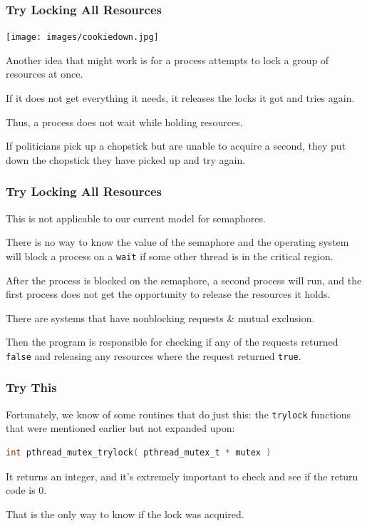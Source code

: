 \begin{frame}
	\frametitle{Try Locking All Resources}
	
	\begin{center}
	\texttt{[image: images/cookiedown.jpg]}
	\end{center}

	Another idea that might work is for a process attempts to lock a group of resources at once.

	If it does not get everything it needs, it releases the locks it got and tries again.

	Thus, a process does not wait while holding resources.

	If politicians pick up a chopstick but are unable to acquire a second, they put down the chopstick they have picked up and try again.

\end{frame}

\begin{frame}
	\frametitle{Try Locking All Resources}

	This is not applicable to our current model for semaphores.

	There is no way to know the value of the semaphore and the operating system will block a process on a \texttt{wait} if some other thread is in the critical region.

	After the process is blocked on the semaphore, a second process will run, and the first process does not get the opportunity to release the resources it holds.

	There are systems that have nonblocking requests \& mutual exclusion.

	Then the program is responsible for checking if any of the requests returned \texttt{false} and releasing any resources where the request returned \texttt{true}.


\end{frame}


\begin{frame}[fragile]
	\frametitle{Try This}
	Fortunately, we know of some routines that do just this: the \texttt{trylock} functions that were mentioned earlier but not expanded upon:
	\begin{lstlisting}[language=C]
int pthread_mutex_trylock( pthread_mutex_t * mutex )
	\end{lstlisting}

	It returns an integer, and it's extremely important to check and see if the return code is 0.

	That is the only way to know if the lock was acquired.

\end{frame}


